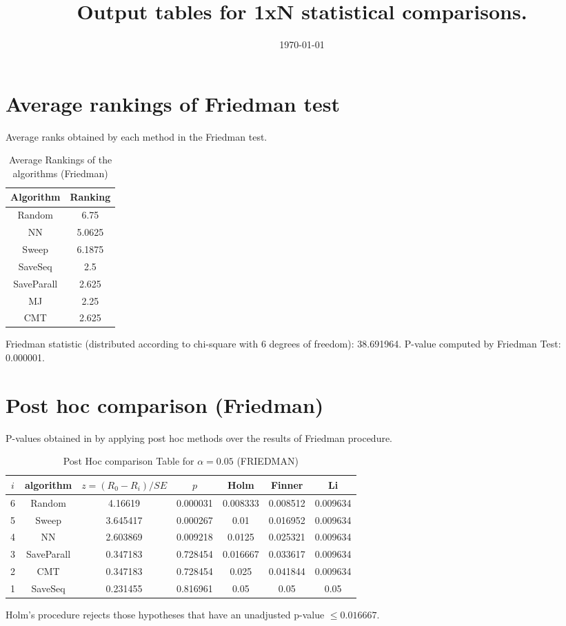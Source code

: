 \documentclass[a4paper,10pt]{article}
\title{Output tables for 1xN statistical comparisons.}
\author{}
\date{\today}
\begin{document}
\begin{landscape}
\pagestyle{empty}
\maketitle
\thispagestyle{empty}

\section{Average rankings of Friedman test}


Average ranks obtained by each method in the Friedman test.

\begin{table}[!htp]
\centering
\begin{tabular}{|c|c|}\hline
Algorithm&Ranking\\\hline
Random&6.75\\NN&5.0625\\Sweep&6.1875\\SaveSeq&2.5\\SaveParall&2.625\\MJ&2.25\\CMT&2.625\\\hline\end{tabular}
\caption{Average Rankings of the algorithms (Friedman)}
\end{table}

Friedman statistic (distributed according to chi-square with 6 degrees of freedom): 38.691964. \newline P-value computed by Friedman Test: 0.000001.\newline


\newpage

\section{Post hoc comparison (Friedman)}


P-values obtained in by applying post hoc methods over the results of Friedman procedure.

\begin{table}[!htp]
\centering\footnotesize
\begin{tabular}{ccccccc}
$i$&algorithm&$z=(R_0 - R_i)/SE$&$p$&Holm &Finner&Li\\
\hline6&Random&4.16619&0.000031&0.008333&0.008512&0.009634\\5&Sweep&3.645417&0.000267&0.01&0.016952&0.009634\\4&NN&2.603869&0.009218&0.0125&0.025321&0.009634\\3&SaveParall&0.347183&0.728454&0.016667&0.033617&0.009634\\2&CMT&0.347183&0.728454&0.025&0.041844&0.009634\\1&SaveSeq&0.231455&0.816961&0.05&0.05&0.05\\\hline
\end{tabular}
\caption{Post Hoc comparison Table for $\alpha=0.05$ (FRIEDMAN)}
\end{table}Holm's procedure rejects those hypotheses that have an unadjusted p-value $\le0.016667$.


\end{landscape}
\end{document}
